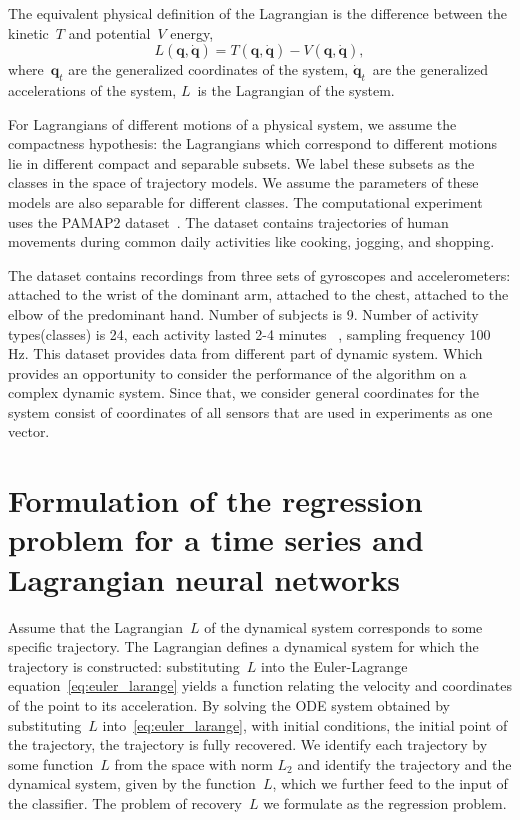 \documentclass[sn-mathphys-num]{sn-jnl}
\theoremstyle{thmstylethree}
\theoremstyle{thmstyletwo}
\theoremstyle{thmstyleone}
\begin{document}
The equivalent physical definition of the Lagrangian is the difference between the kinetic~$T$ and potential~$V$ energy,
\begin{equation}
L\left(\mathbf{q},\dot{\mathbf{q}}\right) = T\left(\mathbf{q},\dot{\mathbf{q}}\right)- V\left(\mathbf{q},\dot{\mathbf{q}}\right), 
\label{eq:L=T-V}
\end{equation}
where~$\mathbf{q}_t$ are the generalized coordinates of the system, $\dot{\mathbf{q}}_t$~are the generalized accelerations of the system, $L$~is the Lagrangian of the system.

For Lagrangians of different motions of a physical system, we assume the compactness hypothesis: the Lagrangians which correspond to different motions lie in different compact and separable subsets. We label these subsets as the classes in the space of trajectory models. We assume the parameters of these models are also separable for different classes. The computational experiment uses the PAMAP2 dataset~\cite{misc_pamap2_physical_activity_monitoring_231}. The dataset contains trajectories of human movements during common daily activities like cooking, jogging, and shopping.

The
dataset contains recordings from three sets of gyroscopes and accelerometers: attached to the
wrist of the dominant arm, attached to the chest, attached to the elbow of the predominant hand. Number of subjects is 9. Number of activity types(classes) is 24, each activity lasted 2-4 minutes ~\cite{misc_pamap2_physical_activity_monitoring_231}, sampling frequency 100 Hz. This dataset provides data from different part of dynamic system. Which provides an opportunity to consider the performance of the algorithm on a complex dynamic system. Since that, we consider general coordinates for the system consist of coordinates of all sensors that are used in experiments as one vector.

\section{Formulation of the regression problem for a time series and
Lagrangian neural networks}

Assume that the Lagrangian~$L$  of the dynamical system corresponds to some specific trajectory. The Lagrangian defines a dynamical system for which the trajectory is constructed: substituting~$L$ into the
Euler-Lagrange equation~\eqref{eq:euler_larange} yields a function relating the velocity and coordinates of the point to its acceleration. By solving the ODE system obtained by substituting~$L$ into~\eqref{eq:euler_larange}, with initial conditions, the initial point of the trajectory, the trajectory is fully recovered.  We identify each trajectory by some function~$L$ from the space with norm $L_2$ and identify the trajectory and the dynamical system, given by the function~$L$, which we further feed to the input of the classifier. The problem of recovery~$L$ we formulate as the regression problem.
\end{document}
